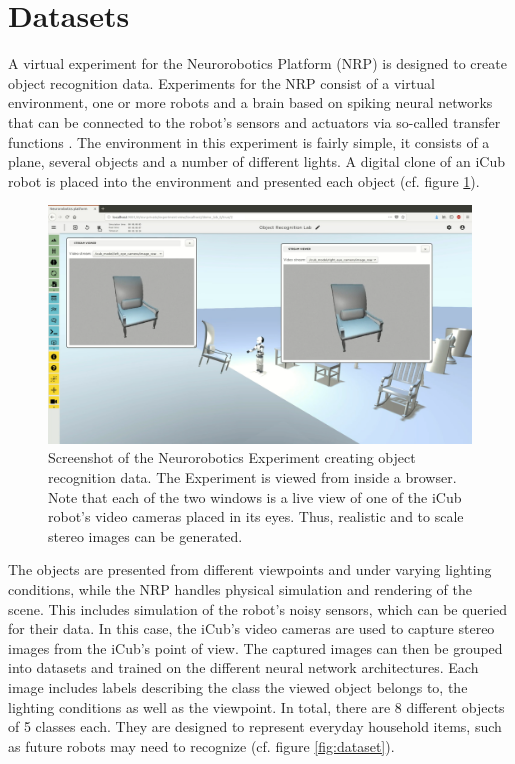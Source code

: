 \section{Datasets}\label{sec:datasets}
A virtual experiment for the Neurorobotics Platform (NRP) is designed to create object recognition data. Experiments for the NRP consist of a virtual environment, one or more robots and a brain based on spiking neural networks that can be connected to the robot's sensors and actuators via so-called transfer functions \cite{knoll2016neurorobotics}. The environment in this experiment is fairly simple, it consists of a plane, several objects and a number of different lights. A digital clone of an iCub robot \cite{vannucci2015visual} is placed into the environment and presented each object (cf. figure \ref{fig:nrp}).
\begin{figure}[H]
    \centering
    \includegraphics[width=\textwidth]{figures/nrp.png}
\caption[Screenshot of the Neurorobotics Experiment creating object recognition data.]{Screenshot of the Neurorobotics Experiment creating object recognition data. The Experiment is viewed from inside a browser. Note that each of the two windows is a live view of one of the iCub robot's video cameras placed in its eyes. Thus, realistic and to scale stereo images can be generated.}\label{fig:nrp}
\end{figure}\newpage\noindent
The objects are presented from different viewpoints and under varying lighting conditions, while the NRP handles physical simulation and rendering of the scene. This includes simulation of the robot's noisy sensors, which can be queried for their data. In this case, the iCub's video cameras are used to capture stereo images from the iCub's point of view. The captured images can then be grouped into datasets and trained on the different neural network architectures. Each image includes labels describing the class the viewed object belongs to, the lighting conditions as well as the viewpoint. In total, there are 8 different objects of 5 classes each. They are designed to represent everyday household items, such as future robots may need to recognize (cf. figure \ref{fig:dataset}).
